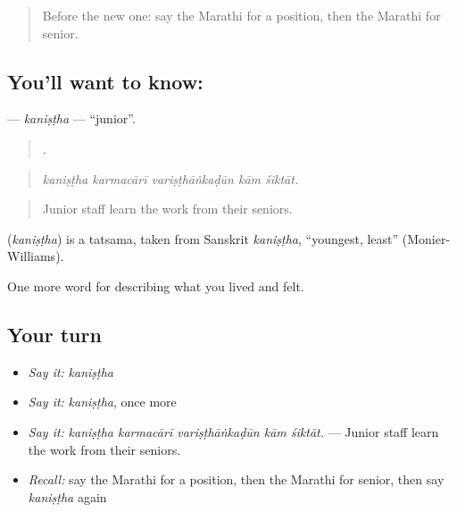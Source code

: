 \label{lesson:MR-C509-kanistha}



\begin{quote}
Before the new one: say the Marathi for a position, then the Marathi for senior.
\end{quote}

\subsection*{You'll want to know: }
\textbf{} — \emph{kaniṣṭha} — \textquotedblleft{}junior\textquotedblright{}.

\begin{quote}
    .
\end{quote}

\begin{quote}
\emph{kaniṣṭha karmacārī variṣṭhāṅkaḍūn kām śiktāt.}
\end{quote}

\begin{quote}
Junior staff learn the work from their seniors.
\end{quote}

\begin{cousinweb}
\textbf{} (\emph{kaniṣṭha}) is a tatsama, taken from Sanskrit \emph{kaniṣṭha}, \textquotedblleft{}youngest, least\textquotedblright{} (Monier-Williams).
\end{cousinweb}

\begin{grammarlens}[title={What you've built}]
One more word for describing what you lived and felt.
\end{grammarlens}

\subsection*{Your turn}
\begin{itemize}
\raggedright
  \item \emph{Say it:} \emph{kaniṣṭha}
  \item \emph{Say it:} \emph{kaniṣṭha}, once more
  \item \emph{Say it:} \emph{kaniṣṭha karmacārī variṣṭhāṅkaḍūn kām śiktāt.} — Junior staff learn the work from their seniors.
  \item \emph{Recall:} say the Marathi for a position, then the Marathi for senior, then say \emph{kaniṣṭha} again
\end{itemize}

